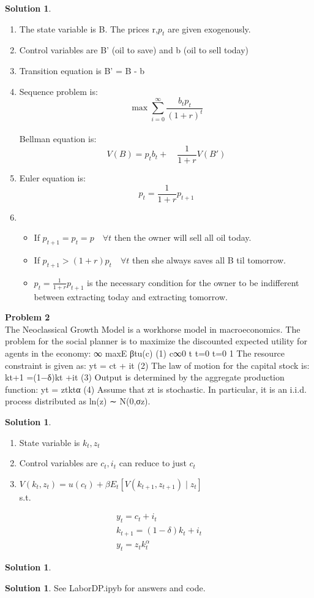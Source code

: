 \documentclass[letterpaper,12pt]{article}
\theoremstyle{definition}
\newtheorem{solution}[theorem]{Solution}
\begin{document}
\begin{solution} ~\\
  \begin{enumerate}
  \item The state variable is B. The prices r,$p_t$ are given exogenously.
  \item Control variables are B' (oil to save) and b (oil to sell today)
  \item Transition equation is B' = B - b
  \item Sequence problem is: \[ \max \sum_{i=0}^\infty \frac{b_tp_t}{(1+r)^t} \] \\
  Bellman equation is:
  \[ V(B) = p_tb_t + \quad \frac{1}{1+r} V(B')\]
  \item Euler equation is: \[ p_t = \frac{1}{1+r}p_{t+1}
  \]
  \item
  \begin{itemize}
    \item If $p_{t+1}=p_t=p \quad \forall t$ then the owner will sell all oil today.
    \item If $p_{t+1} > (1+r) p_t \quad \forall t$ then she always saves all B til tomorrow.
    \item $p_t = \frac{1}{1+r}p_{t+1}$ is the necessary condition for the owner to be indifferent between extracting today and extracting tomorrow.
  \end{itemize}
  \end{enumerate}
\end{solution}

\noindent\textbf{Problem 2} ~\\
The Neoclassical Growth Model is a workhorse model in macroeconomics. The problem for the social planner is to maximize the discounted expected utility for agents in the economy:
∞
 maxE  βtu(c) (1) {c}∞0 t
t=0 t=0 1
The resource constraint is given as:
yt = ct + it (2) The law of motion for the capital stock is:
kt+1 =(1−δ)kt +it (3) Output is determined by the aggregate production function:
yt = ztktα (4) Assume that zt is stochastic. In particular, it is an i.i.d. process distributed as ln(z) ∼
N(0,σz).

\begin{solution} ~\\
  \begin{enumerate}
  \item State variable is $k_t, z_t$
  \item Control variables are $c_t,i_t$ can reduce to just $c_t$
  \item $V(k_t,z_t) = u(c_t) + \beta E_t[V(k_{t+1},z_{t+1}) \mid z_{t}]$ \\ s.t.
  \end{enumerate}
  \begin{gather}
    y_t = c_t + i_t \\
    k_{t+1} = (1- \delta)k_t + i_t \\
    y_t = z_tk_t^\alpha
  \end{gather}
\end{solution}

\begin{solution}

\end{solution}

\begin{solution}
See LaborDP.ipyb for answers and code. 
\end{solution}
\end{document}

